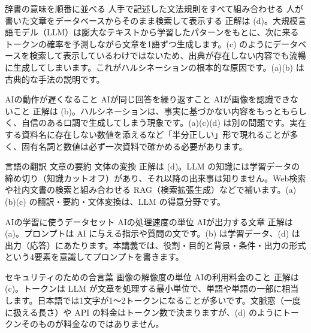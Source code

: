
%
  {辞書の意味を順番に並べる}%
  {人手で記述した文法規則をすべて組み合わせる}%
  {人が書いた文章をデータベースからそのまま検索して表示する}%
  {}%
  {正解は (d)。大規模言語モデル（LLM）は膨大なテキストから学習したパターンをもとに、次に来るトークンの確率を予測しながら文章を1語ずつ生成します。(c) のようにデータベースを検索して表示しているわけではないため、出典が存在しない内容でも流暢に生成してしまいます。これがハルシネーションの根本的な原因です。(a)(b) は古典的な手法の説明です。}

%
  {AIの動作が遅くなること}%
  {}%
  {AIが同じ回答を繰り返すこと}%
  {AIが画像を認識できないこと}%
  {正解は (b)。ハルシネーションは、事実に基づかない内容をもっともらしく、自信のある口調で生成してしまう現象です。(a)(c)(d) は別の問題です。実在する資料名に存在しない数値を添えるなど「半分正しい」形で現れることが多く、固有名詞と数値は必ず一次資料で確かめる必要があります。}

%
  {言語の翻訳}%
  {文章の要約}%
  {文体の変換}%
  {}%
  {正解は (d)。LLM の知識には学習データの締め切り（知識カットオフ）があり、それ以降の出来事は知りません。Web検索や社内文書の検索と組み合わせる RAG（検索拡張生成）などで補います。(a)(b)(c) の翻訳・要約・文体変換は、LLM の得意分野です。}

%
  {}%
  {AIの学習に使うデータセット}%
  {AIの処理速度の単位}%
  {AIが出力する文章}%
  {正解は (a)。プロンプトは AI に与える指示や質問の文です。(b) は学習データ、(d) は出力（応答）にあたります。本講義では、役割・目的と背景・条件・出力の形式という4要素を意識してプロンプトを書きます。}

%
  {セキュリティのための合言葉}%
  {画像の解像度の単位}%
  {}%
  {AIの利用料金のこと}%
  {正解は (c)。トークンは LLM が文章を処理する最小単位で、単語や単語の一部に相当します。日本語では1文字が1〜2トークンになることが多いです。文脈窓（一度に扱える長さ）や API の料金はトークン数で決まりますが、(d) のようにトークンそのものが料金なのではありません。}
